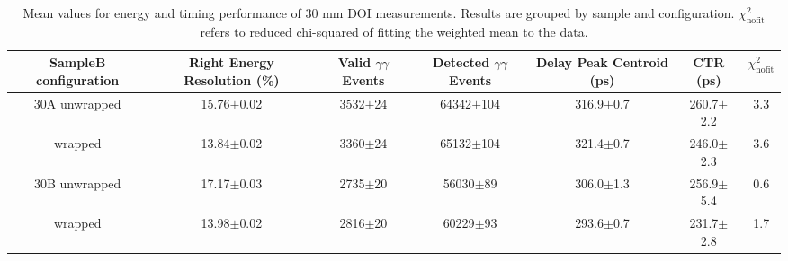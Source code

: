 \begin{table}
\caption{\label{tab:doictrresults} Mean values for energy and timing performance of 30 mm DOI measurements. Results are grouped by sample and configuration. $\chi^2_\text{nofit}$ refers to reduced chi-squared of fitting the weighted mean to the data.}
\begin{tabular}{ccccccc}
\hline
SampleB configuration & Right Energy Resolution (\%) & Valid $\gamma\gamma$ Events & Detected $\gamma\gamma$ Events & Delay Peak Centroid (ps)  & CTR (ps) &  $\chi^2_\text{nofit}$ \\
\hline
30A     unwrapped     &  15.76$\pm$0.02 &  3532$\pm$24 &  64342$\pm$104 &  316.9$\pm$0.7 &  260.7$\pm$2.2 &    3.3 \\
        wrapped       &  13.84$\pm$0.02 &  3360$\pm$24 &  65132$\pm$104 &  321.4$\pm$0.7 &  246.0$\pm$2.3 &    3.6 \\
30B     unwrapped     &  17.17$\pm$0.03 &  2735$\pm$20 &   56030$\pm$89 &  306.0$\pm$1.3 &  256.9$\pm$5.4 &    0.6 \\
        wrapped       &  13.98$\pm$0.02 &  2816$\pm$20 &   60229$\pm$93 &  293.6$\pm$0.7 &  231.7$\pm$2.8 &    1.7 \\
\hline
\end{tabular}
\end{table}
